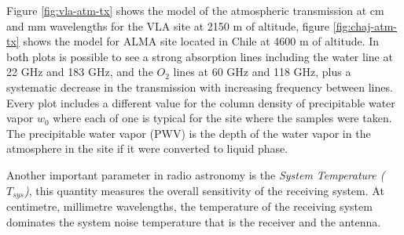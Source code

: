 Figure \ref{fig:vla-atm-tx} shows the model of the atmospheric transmission at cm and mm wavelengths for the VLA site at 2150 m of altitude, figure \ref{fig:chaj-atm-tx} shows the model for ALMA site located in Chile at 4600 m of altitude. In both plots is possible to see a strong absorption lines including the water line at 22 GHz and 183 GHz, and the $O_2$ lines at 60 GHz and 118 GHz, plus a systematic decrease in the transmission with increasing frequency between lines. Every plot includes a different value for the column density of precipitable water vapor $w_0$ where each of one is typical for the site where the samples were taken. The precipitable water vapor (PWV) is the depth of the water vapor in the atmosphere in the site if it were converted to liquid phase.

Another important parameter in radio astronomy is the \textit{System Temperature ($T_{sys}$)}, this quantity measures the overall sensitivity of the receiving system. At centimetre, millimetre wavelengths, the temperature of the receiving system dominates the system noise temperature that is the receiver and the antenna. 


